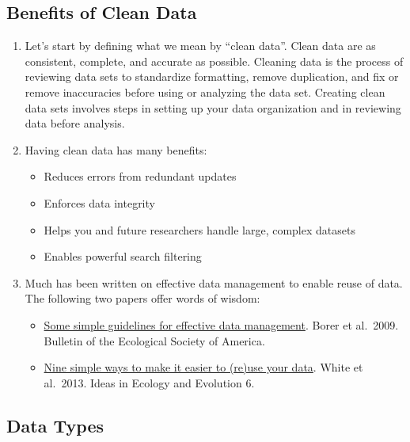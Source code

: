 \documentclass[
]{book}
\providecommand{\tightlist}{%
  \setlength{\itemsep}{0pt}\setlength{\parskip}{0pt}}
\begin{document}
\hypertarget{benefits-of-clean-data}{%
\subsection{Benefits of Clean Data}\label{benefits-of-clean-data}}

\begin{enumerate}
\def\labelenumi{\arabic{enumi}.}
\item
  Let's start by defining what we mean by ``clean data''. Clean data are as consistent, complete, and accurate as possible. Cleaning data is the process of reviewing data sets to standardize formatting, remove duplication, and fix or remove inaccuracies before using or analyzing the data set. Creating clean data sets involves steps in setting up your data organization and in reviewing data before analysis.
\item
  Having clean data has many benefits:

  \begin{itemize}
  \tightlist
  \item
    Reduces errors from redundant updates
  \item
    Enforces data integrity
  \item
    Helps you and future researchers handle large, complex datasets
  \item
    Enables powerful search filtering
  \end{itemize}
\item
  Much has been written on effective data management to enable reuse of data. The following two papers offer words of wisdom:

  \begin{itemize}
  \tightlist
  \item
    \href{https://www.jstor.org/stable/bullecosociamer.90.2.205}{Some simple guidelines for effective data management}. Borer et al.~2009. Bulletin of the Ecological Society of America.
  \item
    \href{https://ojs.library.queensu.ca/index.php/IEE/article/view/4608}{Nine simple ways to make it easier to (re)use your data}. White et al.~2013. Ideas in Ecology and Evolution 6.
  \end{itemize}
\end{enumerate}

\hypertarget{data-types}{%
\subsection{Data Types}\label{data-types}}
\end{document}
